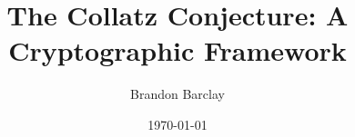 \documentclass[12pt]{article}
\title{The Collatz Conjecture: A Cryptographic Framework}
\author{Brandon Barclay}
\date{\today}
\theoremstyle{plain}
\theoremstyle{definition}
\begin{document}
\maketitle

\begin{abstract}

\end{abstract}

\tableofcontents
\newpage











\appendix




\end{document}
